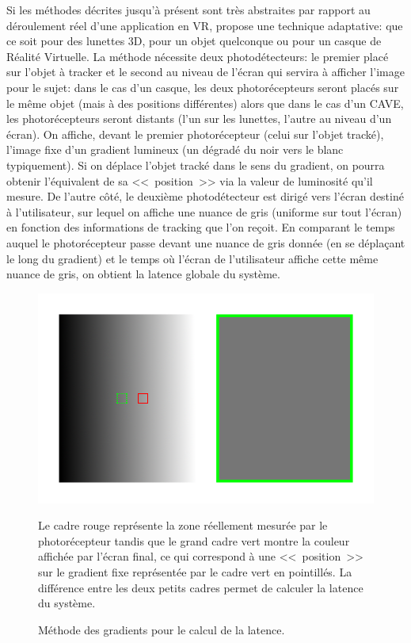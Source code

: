 	\par Si les méthodes décrites jusqu'à présent sont très abstraites par rapport au déroulement réel d'une application en VR, \citep{di_luca_new_2010} propose une technique adaptative: que ce soit pour des lunettes 3D, pour un objet quelconque ou pour un casque de Réalité Virtuelle. La méthode nécessite deux photodétecteurs: le premier placé sur l'objet à tracker et le second au niveau de l'écran qui servira à afficher l'image pour le sujet: dans le cas d'un casque, les deux photorécepteurs seront placés sur le même objet (mais à des positions différentes) alors que dans le cas d'un CAVE, les photorécepteurs seront distants (l'un sur les lunettes, l'autre au niveau d'un écran). On affiche, devant le premier photorécepteur (celui sur l'objet tracké), l'image fixe d'un gradient lumineux (un dégradé du noir vers le blanc typiquement). Si on déplace l'objet tracké dans le sens du gradient, on pourra obtenir l'équivalent de sa <<~position~>> via la valeur de luminosité qu'il mesure. De l'autre côté, le deuxième photodétecteur est dirigé vers l'écran destiné à l'utilisateur, sur lequel on affiche une nuance de gris (uniforme sur tout l'écran) en fonction des informations de tracking que l'on reçoit. En comparant le temps auquel le photorécepteur passe devant une nuance de gris donnée (en se déplaçant le long du gradient) et le temps où l'écran de l'utilisateur affiche cette même nuance de gris, on obtient la latence globale du système.
	
	\begin{figure}
		\centering
		\includegraphics[scale=.5]{Figures/DiLucaGradient}
		\caption{Méthode des gradients pour le calcul de la latence.}{Le cadre rouge représente la zone réellement mesurée par le photorécepteur tandis que le grand cadre vert montre la couleur affichée par l'écran final, ce qui correspond à une <<~position~>> sur le gradient fixe représentée par le cadre vert en pointillés. La différence entre les deux petits cadres permet de calculer la latence du système.}
		\label{fig:di_luca_gradient}
	\end{figure}
	
